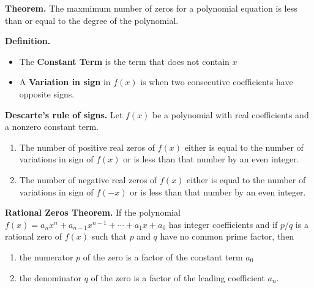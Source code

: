 \documentclass{report}
\begin{document}
    \bigbreak \noindent \bigbreak \noindent
    \begin{mdframed}
      \textbf{Theorem.}
      \bigbreak \noindent 
      The maxmimum number of zeros for a polynomial equation is less than or equal to the degree of the polynomial.
    \end{mdframed}
    \bigbreak \noindent 
    \begin{mdframed}
      \textbf{Definition.}
      \begin{itemize}
        \item The \textbf{Constant Term} is the term that does not contain $x $
        \item A \textbf{Variation in sign} in $f(x)$ is when two consecutive coefficients have opposite signs.
      \end{itemize}
    \end{mdframed}
    \pagebreak \bigbreak \noindent
    \begin{mdframed}
      \textbf{Descarte's rule of signs.}
      \bigbreak \noindent 
      Let $f(x)$ be a polynomial with real coefficients and a nonzero constant term.
      \begin{enumerate}
      \item The number of positive real zeros of $f(x)$ either is equal to the number of variations in sign of $f(x)$ or is less than that number by an even integer.
      \item The number of negative real zeros of $f(x)$ either is equal to the number of variations in sign of $f(-x)$ or is less than that number by an even integer.
      \end{enumerate}
    \end{mdframed}
    \bigbreak \noindent 
    \bigbreak \noindent 
    \begin{mdframed}
      \textbf{Rational Zeros Theorem.}
      \bigbreak \noindent 
      If the polynomial $f(x) = a_nx^n + a_{n-1}x^{n-1} + \cdots + a_1x + a_0$ has integer coefficients and if $p/q$ is a rational zero of $f(x)$ such that $p$ and $q$ have no common prime factor, then
      \begin{enumerate}
      \item the numerator $p$ of the zero is a factor of the constant term $a_0$
      \item the denominator $q$ of the zero is a factor of the leading coefficient $a_n$.
      \end{enumerate}
    \end{mdframed}
\end{document}
